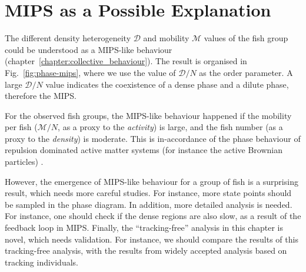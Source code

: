 \documentclass[11pt,twoside]{report}
\begin{document}
\section{MIPS as a Possible Explanation}

The different density heterogeneity $\mathcal{D}$ and mobility $\mathcal{M}$ values of the fish group could be understood as a MIPS-like behaviour (chapter~\ref{chapter:collective_behaviour}). The result is organised in Fig.~\ref{fig:phase-mips}, where we use the value of $\mathcal{D} / N$ as the order parameter. 
A large $\mathcal{D} / N$ value indicates the coexistence of a dense phase and a dilute phase, therefore the MIPS.

For the observed fish groups, the MIPS-like behaviour happened if the mobility per fish ($\mathcal{M}/N$, as a proxy to the \emph{activity}) is large, and the fish number (as a proxy to the \emph{density}) is moderate. This is in-accordance of the phase behaviour of repulsion dominated active matter systems (for instance the active Brownian particles) \cite{turci2021}.

However, the emergence of MIPS-like behaviour for a group of fish is a surprising result, which needs more careful studies. For instance, more state points should be sampled in the phase diagram. In addition, more detailed analysis is needed. For instance, one should check if the dense regions are also slow, as a result of the feedback loop in MIPS. Finally, the ``tracking-free'' analysis in this chapter is novel, which needs validation. For instance, we should compare the results of this tracking-free analysis, with the results from widely accepted analysis based on tracking individuals.
\end{document}
